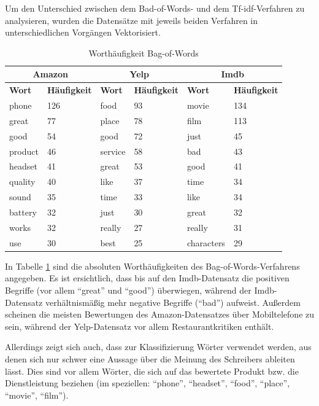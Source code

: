 \documentclass[a4paper,12pt]{article}
\begin{document}
Um den Unterschied zwischen dem Bad-of-Words- und dem Tf-idf-Verfahren zu analysieren, wurden die Datensätze mit jeweils beiden Verfahren in unterschiedlichen Vorgängen Vektorisiert. 

\begin{table}[h]
\centering
\begin{tabular}{|ll|ll|ll|}
\hline
\multicolumn{2}{|c|}{\textbf{Amazon}}&\multicolumn{2}{c}{\textbf{Yelp}}&\multicolumn{2}{|c|}{\textbf{Imdb}} \\
\hline
\textbf{Wort} & \textbf{Häufigkeit} & \textbf{Wort} & \textbf{Häufigkeit} &\textbf{Wort} & \textbf{Häufigkeit} \\
\hline
phone & 126 & food & 93 & movie & 134 \\
great & 77 & place & 78 & film & 113 \\
good & 54 & good & 72 & just & 45 \\
product & 46 & service & 58 & bad & 43 \\
headset & 41 & great & 53 & good & 41 \\
quality & 40 & like & 37 & time & 34 \\
sound & 35 & time & 33 & like & 34 \\
battery & 32 & just & 30 & great & 32 \\
works & 32 & really & 27 & really & 31 \\
use& 30 & best & 25 & characters & 29 \\
\hline
\end{tabular}
\caption{Worthäufigkeit Bag-of-Words}
\label{BoW}
\end{table}

In Tabelle \ref{BoW} sind die absoluten Worthäufigkeiten des Bag-of-Words-Verfahrens angegeben. Es ist ersichtlich, dass bis auf den Imdb-Datensatz die positiven Begriffe (vor allem ``great'' und ``good'') überwiegen, während der Imdb-Datensatz verhältnismäßig mehr negative Begriffe (``bad'') aufweist. Außerdem scheinen die meisten Bewertungen des Amazon-Datensatzes über Mobiltelefone zu sein, während der Yelp-Datensatz vor allem Restaurantkritiken enthält. 

Allerdings zeigt sich auch, dass zur Klassifizierung Wörter verwendet werden, aus denen sich nur schwer eine Aussage über die Meinung des Schreibers ableiten lässt. Dies sind vor allem Wörter, die sich auf das bewertete Produkt bzw. die Dienstleistung beziehen (im speziellen: ``phone'', ``headset'', ``food'', ``place'', ``movie'', ``film'').
\end{document}
